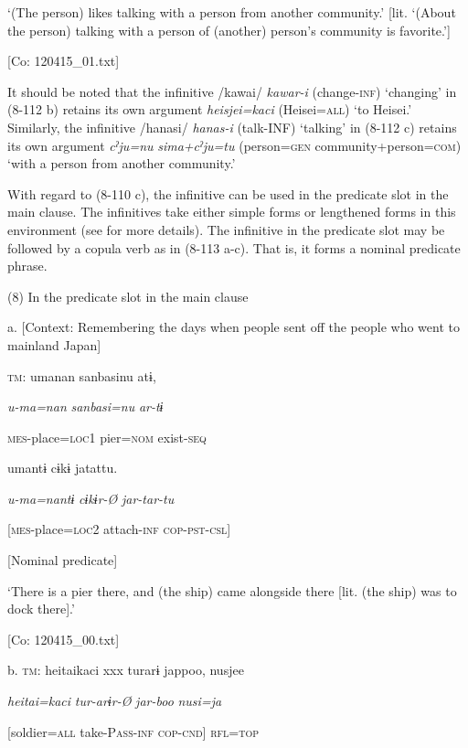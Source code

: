       ‘(The person) likes talking with a person from another community.’ [lit. ‘(About the person) talking with a person of (another) person’s community is favorite.’]

      [Co: 120415\_01.txt]

It should be noted that the infinitive /kawai/ \textit{kawar-i} (change-\textsc{inf}) ‘changing’ in (8-112 b) retains its own argument \textit{heisjei=kaci} (Heisei=\textsc{all}) ‘to Heisei.’ Similarly, the infinitive /hanasi/ \textit{hanas-i} (talk-INF) ‘talking’ in (8-112 c) retains its own argument \textit{cˀju=nu} \textit{sima+cˀju=tu} (person=\textsc{gen} community+person=\textsc{com}) ‘with a person from another community.’

  With regard to (8-110 c), the infinitive can be used in the predicate slot in the main clause. The infinitives take either simple forms or lengthened forms in this environment (see  for more details). The infinitive in the predicate slot may be followed by a copula verb as in (8-113 a-c). That is, it forms a nominal predicate phrase.

(8)  In the predicate slot in the main clause

  a.  [Context: Remembering the days when people sent off the people who went to mainland Japan]

    \textsc{tm}:  umanan  sanbasinu  atɨ,

      \textit{u-ma=nan}  \textit{sanbasi=nu}  \textit{ar-tɨ}

      \textsc{mes}-place=\textsc{loc}1  pier=\textsc{nom}  exist-\textsc{seq}

      umantɨ  cɨkɨ  jatattu.

      \textit{u-ma=nantɨ}  \textit{cɨkɨr-Ø}  \textit{jar-tar-tu}

      [\textsc{mes}-place=\textsc{loc}2  attach-\textsc{inf}  \textsc{cop}-\textsc{pst}-\textsc{csl}]

      [Nominal predicate]

      ‘There is a pier there, and (the ship) came alongside there [lit. (the ship) was to dock there].’

      [Co: 120415\_00.txt]

  b.  \textsc{tm}:  {\textbar}heitai{\textbar}kaci  xxx  turarɨ  jappoo,  nusjee

      \textit{heitai=kaci}    \textit{tur-arɨr-Ø}  \textit{jar-boo}  \textit{nusi=ja}

      [soldier=\textsc{all}    take-P\textsc{ass}-\textsc{inf}  \textsc{cop}-\textsc{cnd}]  \textsc{rfl}=\textsc{top}

